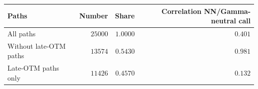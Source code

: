\begin{tabular}{lrrr}
\toprule
Paths & Number & Share & Correlation NN/Gamma-neutral call \\
\midrule
All paths & $25000$ & $1.0000$ & $0.401$ \\
Without late-OTM paths & $13574$ & $0.5430$ & $0.981$ \\
Late-OTM paths only & $11426$ & $0.4570$ & $0.132$ \\
\bottomrule
\end{tabular}
